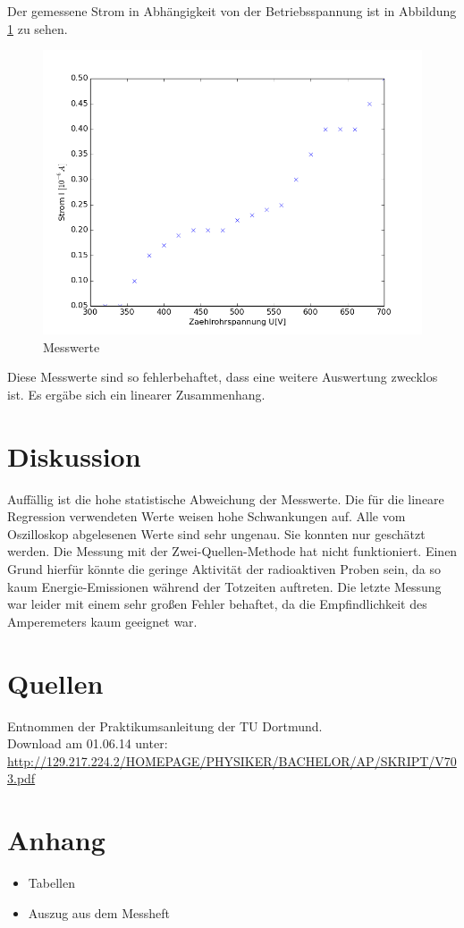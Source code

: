 \documentclass[11pt,ngerman,a4paper]{article}
\begin{document}
Der gemessene Strom in Abhängigkeit von der Betriebsspannung ist in Abbildung \ref{plot3} zu sehen.
\begin{figure}[H]
\centering
\includegraphics[scale=0.6]{plot3.png}
\caption{Messwerte}
\label{plot3}
\end{figure}
\noindent
Diese Messwerte sind so fehlerbehaftet, dass eine weitere Auswertung zwecklos ist. Es ergäbe sich ein linearer Zusammenhang.
\section{Diskussion}
Auffällig ist die hohe statistische Abweichung der Messwerte. Die für die lineare Regression verwendeten Werte weisen hohe Schwankungen auf.
Alle vom Oszilloskop abgelesenen Werte sind sehr ungenau. Sie konnten nur geschätzt werden. Die Messung mit der Zwei-Quellen-Methode hat nicht funktioniert. Einen Grund hierfür könnte die geringe Aktivität der radioaktiven Proben sein, da so kaum Energie-Emissionen während der Totzeiten auftreten. Die letzte Messung war leider mit einem sehr großen Fehler behaftet, da die Empfindlichkeit des Amperemeters kaum geeignet war.

\section{Quellen}
\begin{enumerate}[{[}1{]}]
\item Entnommen der Praktikumsanleitung \textit{} der TU Dortmund. \\
Download am 01.06.14 unter:\\
 \url{http://129.217.224.2/HOMEPAGE/PHYSIKER/BACHELOR/AP/SKRIPT/V703.pdf}
\end{enumerate}

\section{Anhang}
\begin{itemize}
\item Tabellen
\item Auszug aus dem Messheft
\end{itemize}
\end{document}
